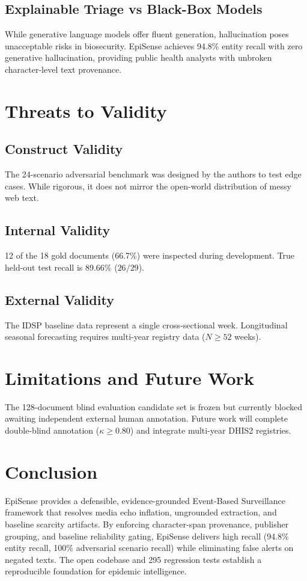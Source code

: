 \documentclass[conference]{IEEEtran}
\begin{document}
\subsection{Explainable Triage vs Black-Box Models}
While generative language models offer fluent generation, hallucination poses unacceptable risks in biosecurity. EpiSense achieves 94.8\% entity recall with zero generative hallucination, providing public health analysts with unbroken character-level text provenance.

\section{Threats to Validity}
\subsection{Construct Validity}
The 24-scenario adversarial benchmark was designed by the authors to test edge cases. While rigorous, it does not mirror the open-world distribution of messy web text.

\subsection{Internal Validity}
12 of the 18 gold documents (66.7\%) were inspected during development. True held-out test recall is 89.66\% ($26/29$).

\subsection{External Validity}
The IDSP baseline data represent a single cross-sectional week. Longitudinal seasonal forecasting requires multi-year registry data ($N \ge 52$ weeks).

\section{Limitations and Future Work}
The 128-document blind evaluation candidate set is frozen but currently blocked awaiting independent external human annotation. Future work will complete double-blind annotation ($\kappa \ge 0.80$) and integrate multi-year DHIS2 registries.

\section{Conclusion}
EpiSense provides a defensible, evidence-grounded Event-Based Surveillance framework that resolves media echo inflation, ungrounded extraction, and baseline scarcity artifacts. By enforcing character-span provenance, publisher grouping, and baseline reliability gating, EpiSense delivers high recall (94.8\% entity recall, 100\% adversarial scenario recall) while eliminating false alerts on negated texts. The open codebase and 295 regression tests establish a reproducible foundation for epidemic intelligence.



\end{document}
